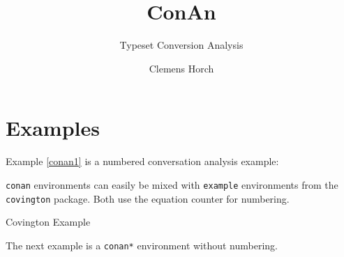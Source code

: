 \documentclass[a4paper]{scrartcl}
\begin{document}
\title{ConAn}
\subtitle{Typeset Conversion Analysis}
\author{Clemens Horch}

\maketitle

\section{Examples}

Example \ref{conan1} is a numbered conversation analysis example:

\begin{conan}[Anton]
	\label{conan1}
\end{conan}


\texttt{conan} environments can easily be mixed with \texttt{example} environments from the \texttt{covington} package. Both use the equation counter for numbering.

\begin{example}
Covington Example
\label{covington1}
\end{example}

The next example is a \texttt{conan*} environment without numbering.

\begin{conan*}
\end{conan*}
\end{document}
